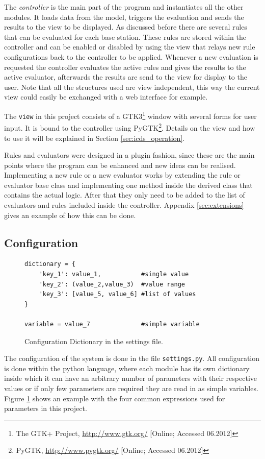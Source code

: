 The \emph{controller} is the main part of the program and instantiates all the other modules.
It loads data from the model, triggers the evaluation and sends the results to the view to be displayed.
As discussed before there are several rules that can be evaluated for each base station.
These rules are stored within the controller and can be enabled or disabled by using the view that relays new rule configurations back to the controller to be applied. 
Whenever a new evaluation is requested the controller evaluates the active rules and gives the results to the active evaluator, afterwards the results are send to the view for display to the user.
Note that all the structures used are view independent, this way the current view could easily be exchanged with a web interface for example.

The \texttt{view} in this project consists of a GTK3\footnote{The GTK+ Project, \url{http://www.gtk.org/} [Online; Accessed 06.2012]} window with several forms for user input.
It is bound to the controller using PyGTK\footnote{PyGTK, \url{http://www.pygtk.org/} [Online; Accessed 06.2012]}.
Details on the view and how to use it will be explained in Section \ref{sec:icds_operation}.

Rules and evaluators were designed in a plugin fashion, since these are the main points where the program can be enhanced and new ideas can be realised.
Implementing a new rule or a new evaluator works by extending the rule or evaluator base class and implementing one method inside the derived class that contains the actual logic.
After that they only need to be added to the list of evaluators and rules included inside the controller.
Appendix \ref{sec:extensions} gives an example of how this can be done.

\subsection{Configuration}
\label{sec:configuration}
\begin{figure}
\hspace*{\dimexpr\fboxsep+\fboxrule}%
\begin{minipage}{\dimexpr\textwidth-4\fboxsep-2\fboxrule} 
\begin{lstlisting}
dictionary = {
	'key_1': value_1,           #single value
	'key_2': (value_2,value_3)  #value range
	'key_3': [value_5, value_6] #list of values
}

variable = value_7              #simple variable
\end{lstlisting}
\end{minipage}
\caption{Configuration Dictionary in the settings file.}
\label{fig:python_dict}
\end{figure}
The configuration of the system is done in the file \texttt{settings.py}.
All configuration is done within the python language, where each module has its own dictionary inside which it can have an arbitrary number of parameters with their respective values or if only few parameters are required they are read in as simple variables.
Figure \ref{fig:python_dict} shows an example with the four common expressions used for parameters in this project.

